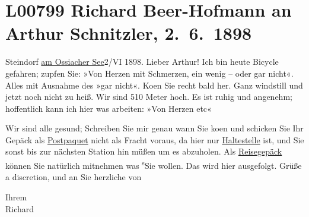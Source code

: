 

\section[Richard Beer-Hofmann an Arthur Schnitzler, 2. 6. 1898]{L00799 Richard Beer-Hofmann an Arthur Schnitzler, 2. 6. 1898}
\nopagebreak{}
\rehead{ }\normalsize\beginnumbering{}
\toendnotes[C]{\smallbreak\pagebreak[2]}
\toendnotes[C]{\smallbreak}
\pstart
           \raggedleft{}{\pb}Steindorf \uline{am Ossiacher
                        See}2/VI 1898.\pend
           \vspace{0.5em}
\pstart
           Lieber Arthur! Ich bin heute Bicycle gefahren; zupfen Sie: »Von
               Herzen mit Schmerzen, ein wenig – oder gar nicht«. Alles mit Ausnahme des »gar
               nicht«. Ko{\geminationm}en Sie recht bald her. Ganz windstill und
               jetzt noch nicht zu heiß. Wir sind 510 Meter hoch. Es ist ruhig und ange{\pb}nehm; hoffentlich kann ich hier was
               arbeiten: »Von Herzen etc«\pend
           
\pstart
           Wir sind alle gesund; Schreiben Sie mir genau wann Sie ko{\geminationm}en und schicken Sie Ihr Gepäck als \uline{Postpaquet} nicht
               als Fracht voraus, da hier nur \uline{Haltestelle} ist, und
               Sie sonst bis zur nächsten Station {\pb} hin müßen um es abzuholen. Als \uline{Reisegepäck} können Sie natürlich mitnehmen was \substVorne{}\textsuperscript{s}\substDazwischen{}S\substHinten{}ie wollen. Das wird hier ausgefolgt. Grüße a discretion, und an Sie herzliche
               von\pend
           
\pstart
           Ihrem{\\}Richard\pend
           \endnumbering{}  \newcommand{\dateiname}{L00799}\newcommand{\titel}{Richard Beer-Hofmann an Arthur Schnitzler, 2. 6. 1898}\newcommand{\editorInnen}{Martin Anton Müller und Gerd-Hermann Susen}
